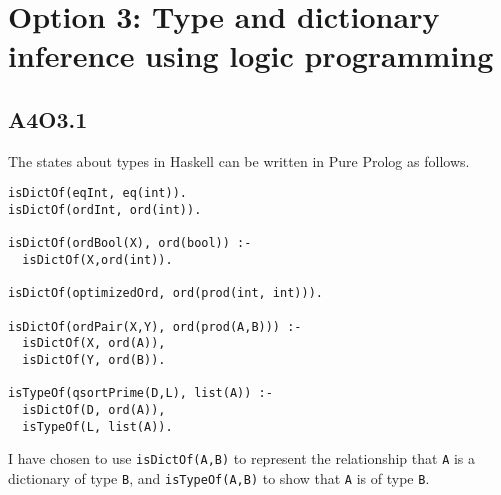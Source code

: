 \section*{Option 3: Type and dictionary inference using logic programming}

\subsection*{A4O3.1}
The states about types in Haskell can be written in Pure Prolog as follows.

\begin{verbatim}
isDictOf(eqInt, eq(int)).
isDictOf(ordInt, ord(int)).

isDictOf(ordBool(X), ord(bool)) :-
  isDictOf(X,ord(int)).

isDictOf(optimizedOrd, ord(prod(int, int))).

isDictOf(ordPair(X,Y), ord(prod(A,B))) :-
  isDictOf(X, ord(A)),
  isDictOf(Y, ord(B)).

isTypeOf(qsortPrime(D,L), list(A)) :-
  isDictOf(D, ord(A)),
  isTypeOf(L, list(A)).
\end{verbatim}

I have chosen to use \texttt{isDictOf(A,B)} to represent the relationship that \texttt{A} is a dictionary of type \texttt{B}, and \texttt{isTypeOf(A,B)} to show that \texttt{A} is of type \texttt{B}.
